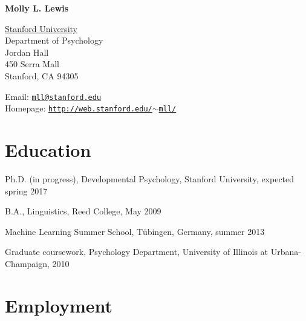\documentclass[letterpaper]{article}
\def\name{Molly L.  Lewis}
\renewenvironment{itemize}{
  \begin{list}{}{
    \setlength{\leftmargin}{1.5em}
  }
}{
  \end{list}
}
\begin{document}
\centerline{\huge \bf \name}
\vspace{0.25in}


 \normalsize
  \href{http://www.stanford.edu/}{Stanford University} \\
  Department of Psychology \\
  Jordan Hall\\
  450 Serra Mall \\
  Stanford, CA 94305\\
  
  \begin{minipage}{0.45\linewidth}
Email: \href{mailto:mll@stanford.edu}{\tt mll@stanford.edu}\\
Homepage: \href{http://web.stanford.edu/~mll/}{\tt http://web.stanford.edu/$\sim$mll/}\\
 
\end{minipage}


\section*{Education}

\begin{itemize}
  \item Ph.D. (in progress), Developmental Psychology, Stanford University, expected spring 2017

  \item B.A., Linguistics, Reed College, May 2009
    \item Machine Learning Summer School, T\"{u}bingen, Germany, summer 2013 

    \item Graduate coursework, Psychology Department, University of Illinois at Urbana-Champaign, 2010

  

\end{itemize}

\section*{Employment}
\end{document}
